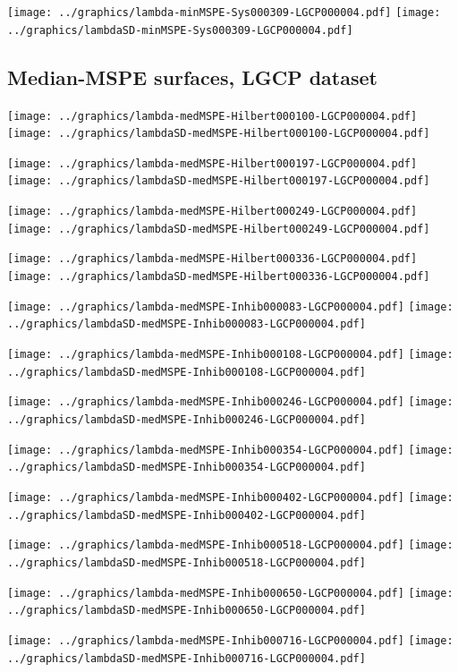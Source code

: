 \documentclass[review]{elsarticle}
\begin{document}
\texttt{[image: ../graphics/lambda-minMSPE-Sys000309-LGCP000004.pdf]}
\texttt{[image: ../graphics/lambdaSD-minMSPE-Sys000309-LGCP000004.pdf]}

\subsection{Median-MSPE surfaces, LGCP dataset}

\texttt{[image: ../graphics/lambda-medMSPE-Hilbert000100-LGCP000004.pdf]}
\texttt{[image: ../graphics/lambdaSD-medMSPE-Hilbert000100-LGCP000004.pdf]}

\texttt{[image: ../graphics/lambda-medMSPE-Hilbert000197-LGCP000004.pdf]}
\texttt{[image: ../graphics/lambdaSD-medMSPE-Hilbert000197-LGCP000004.pdf]}

\texttt{[image: ../graphics/lambda-medMSPE-Hilbert000249-LGCP000004.pdf]}
\texttt{[image: ../graphics/lambdaSD-medMSPE-Hilbert000249-LGCP000004.pdf]}

\texttt{[image: ../graphics/lambda-medMSPE-Hilbert000336-LGCP000004.pdf]}
\texttt{[image: ../graphics/lambdaSD-medMSPE-Hilbert000336-LGCP000004.pdf]}

\texttt{[image: ../graphics/lambda-medMSPE-Inhib000083-LGCP000004.pdf]}
\texttt{[image: ../graphics/lambdaSD-medMSPE-Inhib000083-LGCP000004.pdf]}

\texttt{[image: ../graphics/lambda-medMSPE-Inhib000108-LGCP000004.pdf]}
\texttt{[image: ../graphics/lambdaSD-medMSPE-Inhib000108-LGCP000004.pdf]}

\texttt{[image: ../graphics/lambda-medMSPE-Inhib000246-LGCP000004.pdf]}
\texttt{[image: ../graphics/lambdaSD-medMSPE-Inhib000246-LGCP000004.pdf]}

\texttt{[image: ../graphics/lambda-medMSPE-Inhib000354-LGCP000004.pdf]}
\texttt{[image: ../graphics/lambdaSD-medMSPE-Inhib000354-LGCP000004.pdf]}

\texttt{[image: ../graphics/lambda-medMSPE-Inhib000402-LGCP000004.pdf]}
\texttt{[image: ../graphics/lambdaSD-medMSPE-Inhib000402-LGCP000004.pdf]}

\texttt{[image: ../graphics/lambda-medMSPE-Inhib000518-LGCP000004.pdf]}
\texttt{[image: ../graphics/lambdaSD-medMSPE-Inhib000518-LGCP000004.pdf]}

\texttt{[image: ../graphics/lambda-medMSPE-Inhib000650-LGCP000004.pdf]}
\texttt{[image: ../graphics/lambdaSD-medMSPE-Inhib000650-LGCP000004.pdf]}

\texttt{[image: ../graphics/lambda-medMSPE-Inhib000716-LGCP000004.pdf]}
\texttt{[image: ../graphics/lambdaSD-medMSPE-Inhib000716-LGCP000004.pdf]}
\end{document}
